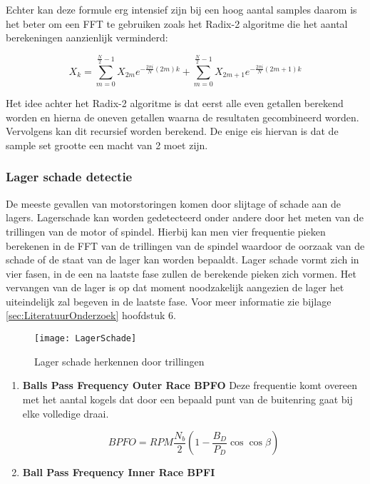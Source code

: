 Echter kan deze formule erg intensief zijn bij een hoog aantal samples daarom is het beter om een \gls{FFT} te gebruiken zoals het Radix-2 algoritme die het aantal berekeningen aanzienlijk verminderd:

\begin{equation}
	X_k = {\sum_{m=0}^{\frac{N}{2}-1}X_{2m}e^{-\frac{2\pi i}{N}(2m)k}} + {\sum_{m=0}^{\frac{N}{2}-1}X_{2m+1}e^{-\frac{2\pi i}{N}(2m+1)k}}
\end{equation}

Het idee achter het Radix-2 algoritme is dat eerst alle even getallen berekend worden en hierna de oneven getallen waarna de resultaten gecombineerd worden. Vervolgens kan dit recursief worden berekend. De enige eis hiervan is dat de sample set grootte een macht van 2 moet zijn.

\subsubsection{Lager schade detectie}

De meeste gevallen van motorstoringen komen door slijtage of schade aan de lagers. Lagerschade kan worden gedetecteerd onder andere door het meten van de trillingen van de motor of spindel. Hierbij kan men vier frequentie pieken berekenen in de \gls{FFT} van de trillingen van de spindel waardoor de oorzaak van de schade of de staat van de lager kan worden bepaaldt. Lager schade vormt zich in vier fasen, in de een na laatste fase zullen de berekende pieken zich vormen. Het vervangen van de lager is op dat moment noodzakelijk aangezien de lager het uiteindelijk zal begeven in de laatste fase. Voor meer informatie zie bijlage \ref{sec:LiteratuurOnderzoek} hoofdstuk 6.


\begin{figure}[h]
	\centering
	\texttt{[image: LagerSchade]}
	\label{fig:LagerSchade}
	\caption{Lager schade herkennen door trillingen}
\end{figure}

\begin{enumerate}
	\item \textbf{Balls Pass Frequency Outer Race \gls{BPFO}} Deze frequentie komt overeen met het aantal kogels dat door een bepaald punt van de buitenring gaat bij elke volledige draai.
	
	\begin{equation}
		BPFO = RPM\frac{N_b}{2}(1-\frac{B_D}{P_D}\cos\cos\beta)
	\end{equation}
	\newpage
	
	\item \textbf{Ball Pass Frequency Inner Race \gls{BPFI}} 
\end{enumerate}

